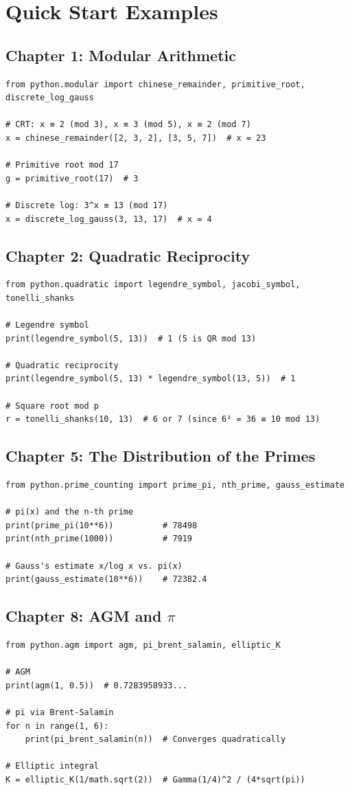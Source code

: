 \section{Quick Start Examples}

\subsection{Chapter 1: Modular Arithmetic}
\begin{lstlisting}[style=python]
from python.modular import chinese_remainder, primitive_root, discrete_log_gauss

# CRT: x ≡ 2 (mod 3), x ≡ 3 (mod 5), x ≡ 2 (mod 7)
x = chinese_remainder([2, 3, 2], [3, 5, 7])  # x = 23

# Primitive root mod 17
g = primitive_root(17)  # 3

# Discrete log: 3^x ≡ 13 (mod 17)
x = discrete_log_gauss(3, 13, 17)  # x = 4
\end{lstlisting}

\subsection{Chapter 2: Quadratic Reciprocity}
\begin{lstlisting}[style=python]
from python.quadratic import legendre_symbol, jacobi_symbol, tonelli_shanks

# Legendre symbol
print(legendre_symbol(5, 13))  # 1 (5 is QR mod 13)

# Quadratic reciprocity
print(legendre_symbol(5, 13) * legendre_symbol(13, 5))  # 1

# Square root mod p
r = tonelli_shanks(10, 13)  # 6 or 7 (since 6² = 36 ≡ 10 mod 13)
\end{lstlisting}

\subsection{Chapter 5: The Distribution of the Primes}
\begin{lstlisting}[style=python]
from python.prime_counting import prime_pi, nth_prime, gauss_estimate

# pi(x) and the n-th prime
print(prime_pi(10**6))          # 78498
print(nth_prime(1000))          # 7919

# Gauss's estimate x/log x vs. pi(x)
print(gauss_estimate(10**6))    # 72382.4
\end{lstlisting}

\subsection{Chapter 8: AGM and \texorpdfstring{$\pi$}{Pi}}
\begin{lstlisting}[style=python]
from python.agm import agm, pi_brent_salamin, elliptic_K

# AGM
print(agm(1, 0.5))  # 0.7283958933...

# pi via Brent-Salamin
for n in range(1, 6):
    print(pi_brent_salamin(n))  # Converges quadratically

# Elliptic integral
K = elliptic_K(1/math.sqrt(2))  # Gamma(1/4)^2 / (4*sqrt(pi))
\end{lstlisting}

